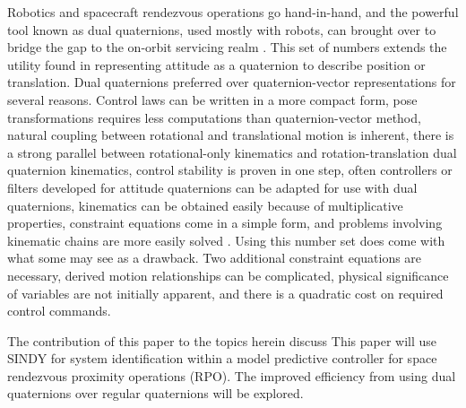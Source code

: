 \documentclass[letterpaper, preprint, paper,11pt]{AAS}	%
\begin{document}
Robotics and spacecraft rendezvous operations go hand-in-hand, and the powerful tool known as dual quaternions, used mostly with robots, can brought over to bridge the gap to the on-orbit servicing realm \cite{valverde_tsiotras_spacecraftrobot}. This set of numbers extends the utility found in representing attitude as a quaternion to describe position or translation. Dual quaternions preferred over quaternion-vector representations for several reasons. Control laws can be written in a more compact form, pose transformations requires less computations than quaternion-vector method, natural coupling between rotational and translational motion is inherent, there is a strong parallel between rotational-only kinematics and rotation-translation dual quaternion kinematics, control stability is proven in one step, often controllers or filters developed for attitude quaternions can be adapted for use with dual quaternions, kinematics can be obtained easily because of multiplicative properties, constraint equations come in a simple form, and problems involving kinematic chains are more easily solved \cite{filipe_tsiotras_dualQ,tsiotras_valverde_DualQuatAsTool,dooley_mccarthy_spatialrigidbody}. Using this number set does come with what some may see as a drawback. Two additional constraint equations are necessary, derived motion relationships can be complicated, physical significance of variables are not initially apparent, and there is a quadratic cost on required control commands. \cite{dooley_mccarthy_spatialrigidbody,lee_mesbahi,constrainedautonomousprecision}


The contribution of this paper to the topics herein discuss
This paper will use SINDY for system identification within a model predictive controller for space rendezvous proximity operations (RPO). The improved efficiency from using dual quaternions over regular quaternions will be explored. 
\end{document}
